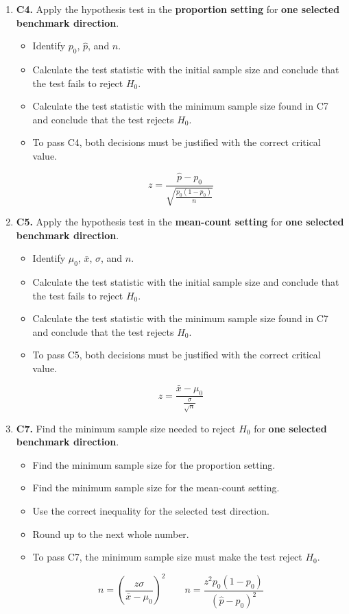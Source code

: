\documentclass[12pt]{article}
\begin{document}
\begin{enumerate}
	\item \textbf{C4.} Apply the hypothesis test in the \textbf{proportion setting} for \textbf{one selected benchmark direction}.
	\begin{itemize}
		\item Identify \(p_0\), \(\hat p\), and \(n\).
		\item Calculate the test statistic with the initial sample size and conclude that the test fails to reject \(H_0\).
		\item Calculate the test statistic with the minimum sample size found in C7 and conclude that the test rejects \(H_0\).
		\item To pass C4, both decisions must be justified with the correct critical value.
	\end{itemize}
	\[
	z=\frac{\hat p-p_0}{\sqrt{\frac{p_0(1-p_0)}{n}}}
	\]
	
	\item \textbf{C5.} Apply the hypothesis test in the \textbf{mean-count setting} for \textbf{one selected benchmark direction}.
	\begin{itemize}
		\item Identify \(\mu_0\), \(\bar x\), \(\sigma\), and \(n\).
		\item Calculate the test statistic with the initial sample size and conclude that the test fails to reject \(H_0\).
		\item Calculate the test statistic with the minimum sample size found in C7 and conclude that the test rejects \(H_0\).
		\item To pass C5, both decisions must be justified with the correct critical value.
	\end{itemize}
	\[
	z=\frac{\bar x-\mu_0}{\frac{\sigma}{\sqrt{n}}}
	\]
	
	\item \textbf{C7.} Find the minimum sample size needed to reject \(H_0\) for \textbf{one selected benchmark direction}.
	\begin{itemize}
		\item Find the minimum sample size for the proportion setting.
		\item Find the minimum sample size for the mean-count setting.
		\item Use the correct inequality for the selected test direction.
		\item Round up to the next whole number.
		\item To pass C7, the minimum sample size must make the test reject \(H_0\).
	\end{itemize}
	\[
	n=\left(\frac{z\sigma}{\bar x-\mu_0}\right)^2
	\qquad 
	n=\frac{z^2p_0(1-p_0)}{(\hat p-p_0)^2}
	\]
	

\end{enumerate}
\end{document}
